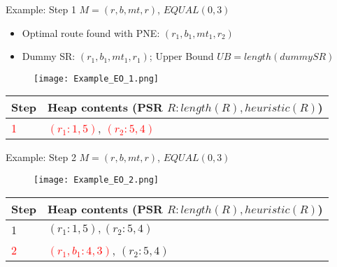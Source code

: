 \begin{frame}{Example: Step 1}
	$M = (r, b, mt, r)$, $EQUAL(0, 3)$
	
	\begin{itemize}
		\item Optimal route found with PNE: $(r_1, b_1, mt_1, r_2)$
		\item Dummy SR: $(r_1, b_1, mt_1, r_1)$; Upper Bound $UB = length(dummySR)$
	\end{itemize}

	\begin{figure}[h]
		\texttt{[image: Example\_EO\_1.png]}
	\end{figure}
	
	\begin{table}[h]
		\centering
		\begin{tabular}{ |l|p{10cm}| } 
			\hline
			Step & Heap contents (PSR $R : length(R), heuristic(R)$) \\
			\hline
			\textcolor{red}{1} & \textcolor{red}{$(r_1 : 1, 5)$}, \textcolor{red}{$(r_2 : 5, 4)$} \\ 
			\hline
		\end{tabular}
	\end{table}
		
\end{frame}

\begin{frame}{Example: Step 2}
	$M = (r, b, mt, r)$, $EQUAL(0, 3)$

	\begin{figure}[h]
		\texttt{[image: Example\_EO\_2.png]}
	\end{figure}
	
	\begin{table}[h]
		\centering
		\begin{tabular}{ |l|p{10cm}| } 
			\hline
			Step & Heap contents (PSR $R : length(R), heuristic(R)$) \\
			\hline
			1 & $(r_1 : 1, 5), (r_2 : 5, 4)$ \\ 
			\hline
			\textcolor{red}{2} & \textcolor{red}{$(r_1, b_1 : 4, 3)$}, $(r_2 : 5, 4)$ \\ 
			\hline
		\end{tabular}
	\end{table}

\end{frame}

